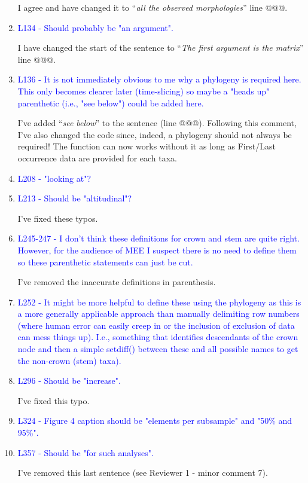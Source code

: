 \documentclass[12pt,letterpaper]{article}
\begin{document}
\begin{enumerate}
I agree and have changed it to ``\textit{all the observed morphologies}'' line @@@.

\item{\textcolor{blue}{L134 - Should probably be "an argument".}}

I have changed the start of the sentence to ``\textit{The first argument is the matrix}'' line @@@.

\item{\textcolor{blue}{L136 - It is not immediately obvious to me why a phylogeny is required here. This only becomes clearer later (time-slicing) so maybe a "heads up" parenthetic (i.e., "see below") could be added here.}}

I've added ``\textit{see below}'' to the sentence (line @@@).
Following this comment, I've also changed the code since, indeed, a phylogeny should not always be required!
The function can now works without it as long as First/Last occurrence data are provided for each taxa.

\item{\textcolor{blue}{L208 - "looking at"?}}
\item{\textcolor{blue}{L213 - Should be "altitudinal"?}}

I've fixed these typos.

\item{\textcolor{blue}{L245-247 - I don't think these definitions for crown and stem are quite right. However, for the audience of MEE I suspect there is no need to define them so these parenthetic statements can just be cut.}}

I've removed the inaccurate definitions in parenthesis.

\item{\textcolor{blue}{L252 - It might be more helpful to define these using the phylogeny as this is a more generally applicable approach than manually delimiting row numbers (where human error can easily creep in or the inclusion of exclusion of data can mess things up). I.e., something that identifies descendants of the crown node and then a simple setdiff() between these and all possible names to get the non-crown (stem) taxa).}}


\item{\textcolor{blue}{L296 - Should be "increase".}}

I've fixed this typo.

\item{\textcolor{blue}{L324 - Figure 4 caption should be "elements per subsample" and "50\% and 95\%".}}


\item{\textcolor{blue}{L357 - Should be "for such analyses".}}

I've removed this last sentence (see Reviewer 1 - minor comment 7).

\end{enumerate}
\end{document}
